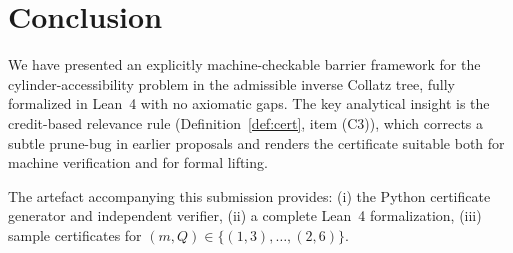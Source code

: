 \documentclass[11pt,a4paper]{article}
\theoremstyle{plain}
\theoremstyle{definition}
\theoremstyle{plain}
\begin{document}
\section{Conclusion}

We have presented an explicitly machine-checkable barrier framework
for the cylinder-accessibility problem in the admissible inverse
Collatz tree, fully formalized in Lean~4 with no axiomatic gaps.
The key analytical insight is the credit-based relevance rule
(Definition~\ref{def:cert}, item (C3)), which corrects a subtle
prune-bug in earlier proposals and renders the certificate suitable
both for machine verification and for formal lifting.

The artefact accompanying this submission provides:
(i) the Python certificate generator and independent verifier,
(ii) a complete Lean~4 formalization,
(iii) sample certificates for $(m, Q) \in \{(1,3),\dots,(2,6)\}$.
\end{document}
